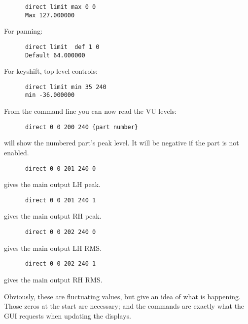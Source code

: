    \begin{verbatim}
      direct limit max 0 0
      Max 127.000000
   \end{verbatim}

For panning:

   \begin{verbatim}
      direct limit  def 1 0
      Default 64.000000
   \end{verbatim}

For keyshift, top level controls:

   \begin{verbatim}
      direct limit min 35 240
      min -36.000000
   \end{verbatim}

From the command line you can now read the VU levels:

   \begin{verbatim}
      direct 0 0 200 240 {part number}
   \end{verbatim}

will show the numbered part's peak level.
It will be negative if the part is not enabled.

   \begin{verbatim}
      direct 0 0 201 240 0
   \end{verbatim}

gives the main output LH peak.

   \begin{verbatim}
      direct 0 0 201 240 1
   \end{verbatim}

gives the main output RH peak.

   \begin{verbatim}
      direct 0 0 202 240 0
   \end{verbatim}

gives the main output LH RMS.

   \begin{verbatim}
      direct 0 0 202 240 1
   \end{verbatim}

gives the main output RH RMS.

   Obviously, these are fluctuating values, but give an idea of what is
   happening.  Those zeros at the start are necessary; and the commands are
   exactly what the GUI requests when updating the displays.

